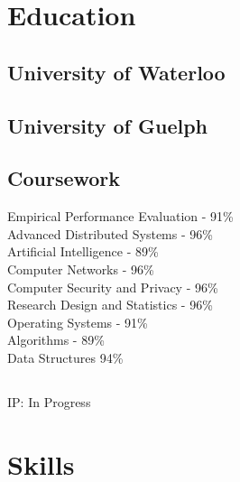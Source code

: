 \documentclass[]{chowes-resume}
\begin{document}
\begin{minipage}[t]{0.33\textwidth}



\section{Education} 

\subsection{University of Waterloo}
\sectionsep

\subsection{University of Guelph}
\sectionsep

\subsection{Coursework}
Empirical Performance Evaluation - 91\%\\
Advanced Distributed Systems - 96\%\\
Artificial Intelligence - 89\%\\
Computer Networks - 96\%\\
Computer Security and Privacy - 96\%\\
Research Design and Statistics - 96\%\\
Operating Systems - 91\%\\
Algorithms - 89\%\\
Data Structures 94\%\\

\subsection{}
IP: In Progress
\sectionsep



\section{Skills}


\end{minipage}
\end{document}
